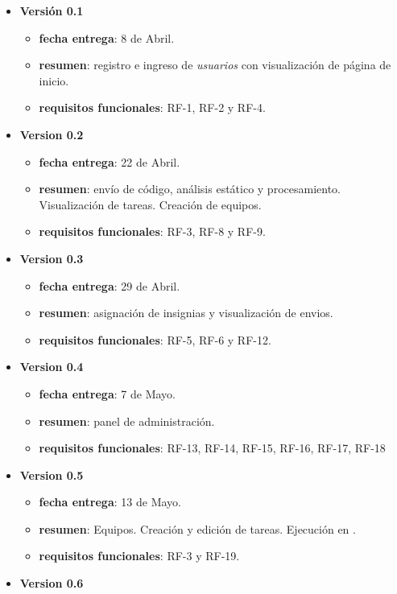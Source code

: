 \documentclass[11pt,spanish,listoffigures,listoftables]{tfgetsinf}
\begin{document}
\begin{itemize}
	\item \textbf{Versión 0.1}
	\begin{itemize}
		\item \textbf{fecha entrega}: 8 de Abril.
		\item \textbf{resumen}: registro e ingreso de \textit{usuarios} con visualización de página de inicio.
		\item \textbf{requisitos funcionales}: RF-1, RF-2 y RF-4.
	\end{itemize}
	\item \textbf{Version 0.2}
	\begin{itemize}
		\item \textbf{fecha entrega}: 22 de Abril.
		\item \textbf{resumen}: envío de código, análisis estático y procesamiento. Visualización de \gls{tarea}s. Creación de equipos.
		\item \textbf{requisitos funcionales}: RF-3, RF-8 y RF-9.
	\end{itemize}
	\item \textbf{Version 0.3}
\begin{itemize}
	\item \textbf{fecha entrega}: 29 de Abril.
	\item \textbf{resumen}: asignación de \gls{insignia}s y visualización de \gls{envio}s.
	\item \textbf{requisitos funcionales}: RF-5, RF-6 y RF-12.
\end{itemize}
	\item \textbf{Version 0.4}
\begin{itemize}
	\item \textbf{fecha entrega}: 7 de Mayo.
	\item \textbf{resumen}: panel de administración.
	\item \textbf{requisitos funcionales}: RF-13, RF-14, RF-15, RF-16, RF-17, RF-18
\end{itemize}
	\item \textbf{Version 0.5}
\begin{itemize}
	\item \textbf{fecha entrega}: 13 de Mayo.
	\item \textbf{resumen}: Equipos. Creación y edición de \gls{tarea}s. Ejecución en \kahan.
	\item \textbf{requisitos funcionales}: RF-3 y RF-19.
\end{itemize}
	\item \textbf{Version 0.6}

\end{itemize}
\end{document}
